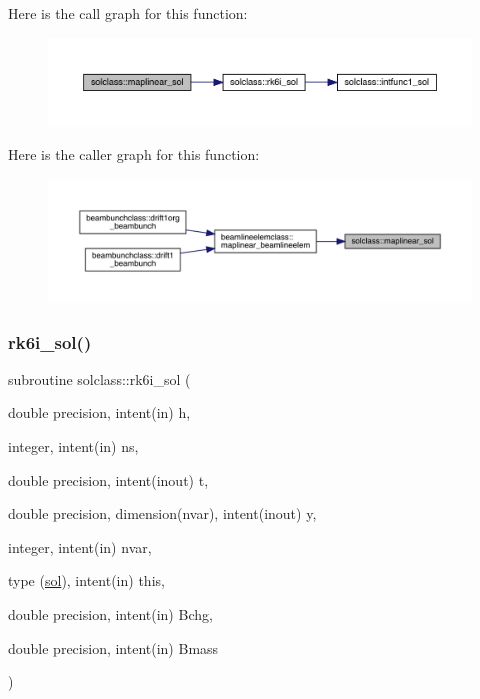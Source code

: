 Here is the call graph for this function\+:\nopagebreak
\begin{figure}[H]
\begin{center}
\leavevmode
\includegraphics[width=350pt]{namespacesolclass_ac1f4d73224d7585c1be1bb6f24f125df_cgraph}
\end{center}
\end{figure}
Here is the caller graph for this function\+:\nopagebreak
\begin{figure}[H]
\begin{center}
\leavevmode
\includegraphics[width=350pt]{namespacesolclass_ac1f4d73224d7585c1be1bb6f24f125df_icgraph}
\end{center}
\end{figure}
\mbox{\label{namespacesolclass_ae384372c54c045759b9bb9e1eb0886a1}} 
\subsubsection{\texorpdfstring{rk6i\_sol()}{rk6i\_sol()}}
{\footnotesize\ttfamily subroutine solclass\+::rk6i\+\_\+sol (\begin{DoxyParamCaption}\item[{double precision, intent(in)}]{h,  }\item[{integer, intent(in)}]{ns,  }\item[{double precision, intent(inout)}]{t,  }\item[{double precision, dimension(nvar), intent(inout)}]{y,  }\item[{integer, intent(in)}]{nvar,  }\item[{type (\mbox{\hyperlink{namespacesolclass_structsolclass_1_1sol}{sol}}), intent(in)}]{this,  }\item[{double precision, intent(in)}]{Bchg,  }\item[{double precision, intent(in)}]{Bmass }\end{DoxyParamCaption})}

